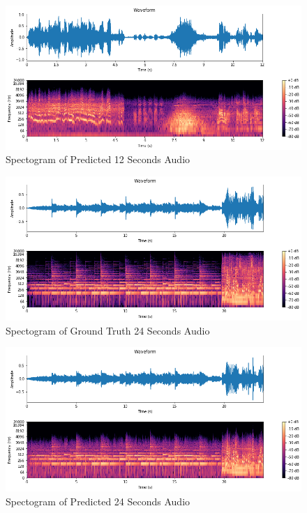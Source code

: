 \documentclass{ioereport}
\begin{document}
    \begin{figure}[H]
        \centering
        \includegraphics[width=\linewidth]{assets/audio_results/12secondspred.png}
        \caption{Spectogram of Predicted 12 Seconds Audio}
        \label{fig:pred-12s-spec}
    \end{figure}

    \begin{figure}[H]
        \centering
        \includegraphics[width=\linewidth]{assets/audio_results/24seconds.png}
        \caption{Spectogram of Ground Truth 24 Seconds Audio}
        \label{fig:gt-24s-spec}
    \end{figure}
    
    \begin{figure}[H]
        \centering
        \includegraphics[width=\linewidth]{assets/audio_results/24secondspred.png}
        \caption{Spectogram of Predicted 24 Seconds Audio}
        \label{fig:pred-24s-spec}
    \end{figure}
    
\end{document}
